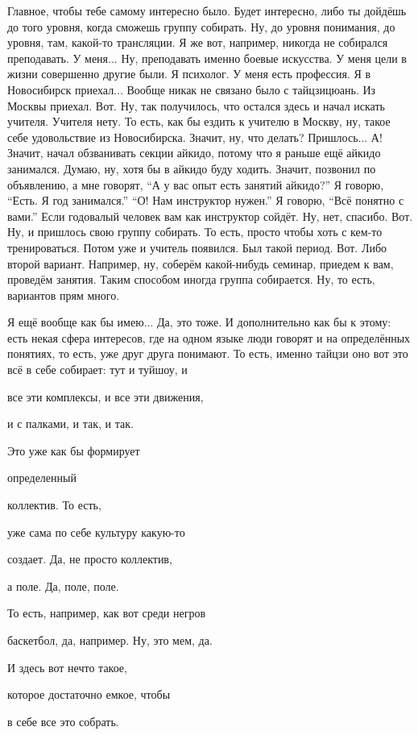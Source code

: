 \A
Главное, чтобы тебе самому
интересно было. Будет интересно,
либо ты
дойдёшь до того
уровня, когда сможешь
группу собирать.
Ну, до уровня понимания,
до уровня, там, какой-то
трансляции. Я же вот, например,
никогда не собирался преподавать.
У меня... Ну,
преподавать именно боевые искусства.
У меня цели в жизни
совершенно другие были. Я психолог.
У меня есть профессия.
Я в Новосибирск приехал...
Вообще никак не связано
было с тайцзицюань.
Из Москвы приехал. Вот.
Ну, так получилось, что остался здесь
и начал искать учителя.
Учителя нету.
То есть, как бы ездить к учителю в Москву,
ну, такое себе
удовольствие из Новосибирска.
Значит, ну,
что делать? Пришлось... А!
Значит, начал обзванивать
секции айкидо, потому что я раньше
ещё айкидо занимался. Думаю, ну,
хотя бы в айкидо буду ходить.
Значит,
позвонил по объявлению,
а мне говорят,
``А у вас опыт есть
занятий айкидо?'' Я говорю, ``Есть. Я год
занимался.'' ``О! Нам инструктор
нужен.'' Я говорю, ``Всё понятно с вами.''
Если годовалый
человек вам как инструктор сойдёт.
Ну, нет, спасибо.
Вот. Ну, и
пришлось свою группу собирать.
То есть, просто чтобы хоть с кем-то
тренироваться. Потом
уже и учитель появился.
Был такой
период. Вот.
Либо второй вариант. Например,
ну, соберём какой-нибудь семинар,
приедем к вам, проведём занятия.
Таким способом
иногда группа
собирается. Ну, то есть,
вариантов прям много.

\I
Я ещё вообще
как бы имею...
Да, это тоже. И
дополнительно как бы
к этому: есть
некая
сфера интересов, где
на одном языке люди говорят
и на определённых
понятиях, то есть, уже
друг друга
понимают. То есть, именно тайцзи
оно вот это всё в себе собирает:
тут и туйшоу, и

все эти комплексы, и все эти движения,

и с палками, и так, и так.

Это уже как бы формирует

определенный

коллектив. То есть,

уже сама по себе культуру какую-то

создает. Да, не просто коллектив,

а поле. Да, поле, поле.

То есть, например, как вот среди негров

баскетбол, да, например. Ну, это мем, да.

И здесь вот нечто такое,

которое достаточно емкое, чтобы

в себе все это собрать.

